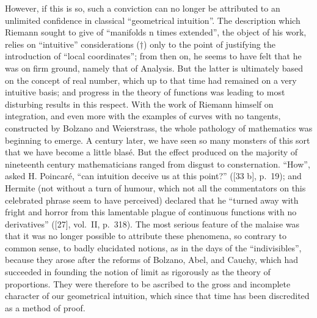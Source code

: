 However, if this is so, such a conviction can no longer be attributed to an unlimited confidence in classical ``geometrical intuition''. The description which Riemann sought to give of ``manifolds n times extended'', the object of his work, relies on ``intuitive'' considerations (†) only to the point of justifying the introduction of ``local coordinates''; from then on, he seems to have felt that he was on firm ground, namely that of Analysis. But the latter is ultimately based on the concept of real number, which up to that time had remained on a very intuitive basis; and progress in the theory of functions was leading to most disturbing results in this respect. With the work of Riemann himself on integration, and even more with the examples of curves with no tangents, constructed by Bolzano and Weierstrass, the whole pathology of mathematics was beginning to emerge. A century later, we have seen so many monsters of this sort that we have become a little blasé. But the effect produced on the majority of nineteenth century mathematicians ranged from disgust to consternation. ``How'', asked H. Poincaré, ``can intuition deceive us at this point?'' ({[}33 b{]}, p.~19); and Hermite (not without a turn of humour, which not all the commentators on this celebrated phrase seem to have perceived) declared that he ``turned away with fright and horror from this lamentable plague of continuous functions with no derivatives'' ({[}27{]}, vol.~II, p.~318). The most serious feature of the malaise was that it was no longer possible to attribute these phenomena, so contrary to common sense, to badly elucidated notions, as in the days of the ``indivisibles'', because they arose after the reforms of Bolzano, Abel, and Cauchy, which had succeeded in founding the notion of limit as rigorously as the theory of proportions. They were therefore to be ascribed to the gross and incomplete character of our geometrical intuition, which since that time has been discredited as a method of proof.

